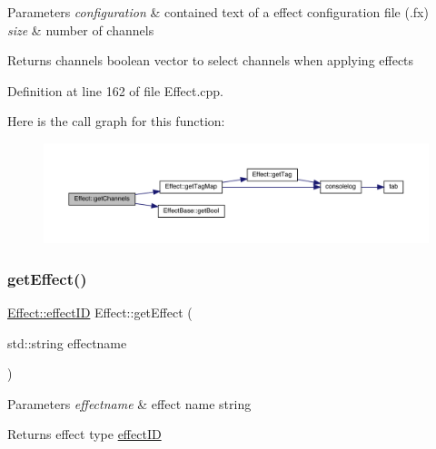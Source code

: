 \begin{DoxyParams}{Parameters}
{\em configuration} & contained text of a effect configuration file (.fx) \\
\hline
{\em size} & number of channels \\
\hline
\end{DoxyParams}
\begin{DoxyReturn}{Returns}
channels boolean vector to select channels when applying effects 
\end{DoxyReturn}


Definition at line 162 of file Effect.\+cpp.

Here is the call graph for this function\+:
\nopagebreak
\begin{figure}[H]
\begin{center}
\leavevmode
\includegraphics[width=350pt]{class_effect_ae108c1645f18162929cd5c272a30f74e_cgraph}
\end{center}
\end{figure}
\mbox{\label{class_effect_a32185d446a9dc77963a322b64d2f9e27}} 
\subsubsection{\texorpdfstring{get\+Effect()}{getEffect()}}
{\footnotesize\ttfamily \hyperlink{class_effect_a6422fe21e9e452943fbc3344884a6fed}{Effect\+::effect\+ID} Effect\+::get\+Effect (\begin{DoxyParamCaption}\item[{std\+::string}]{effectname }\end{DoxyParamCaption})\hspace{0.3cm}{\ttfamily [static]}}


\begin{DoxyParams}{Parameters}
{\em effectname} & effect name string \\
\hline
\end{DoxyParams}
\begin{DoxyReturn}{Returns}
effect type \hyperlink{class_effect_a6422fe21e9e452943fbc3344884a6fed}{effect\+ID} 
\end{DoxyReturn}


